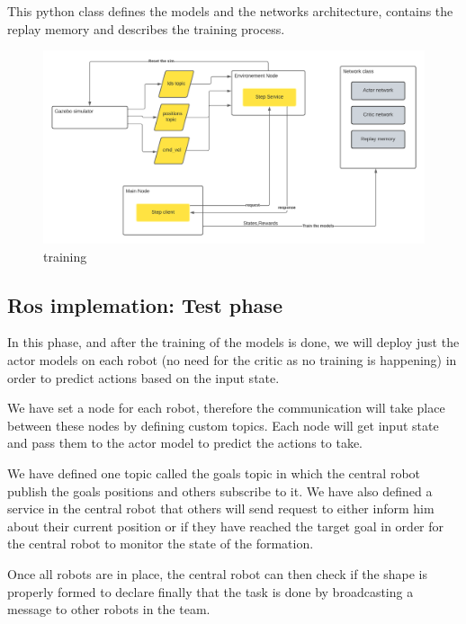 \documentclass[12pt]{extarticle}
\begin{document}
This python class defines the models and the networks architecture, contains the replay memory and describes the training process.  







 \begin{figure}[h]  
\centering
\includegraphics[scale=0.6]{training}
\caption[training phase]{training}
\end{figure}

\pagebreak
\subsection{Ros implemation: Test phase}
In this phase, and after the training of the models is done, we will deploy  just the actor models on each robot (no need for the critic as no training is happening)  in order to predict  actions based on the input state.

We have set a node for each robot, therefore the communication will take place  between these nodes by defining custom topics. Each node will get input state and pass them to the actor model to predict the actions to take.

We have defined one topic called the goals topic in which the central robot  publish the goals positions and  others subscribe to it. We have also defined a service in the central robot that  others will send request to  either  inform him about their current position  or if they have reached the target goal in order for the central robot to monitor the state of the formation.

Once all robots are in place, the central robot can then check if the  shape is properly formed to declare finally that the task is done by broadcasting a message to other robots in the team.

  
\end{document}
